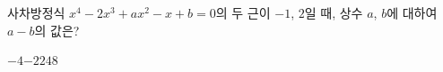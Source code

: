 사차방정식 $x^4-2x^3+ax^2-x+b=0$의 두 근이 $-1$, $2$일 때, 상수 $a$, $b$에 대하여 $a-b$의 값은?
\begin{choices32}{$-4$}{$-2$}{$2$}{$4$}{$8$}\end{choices32}

